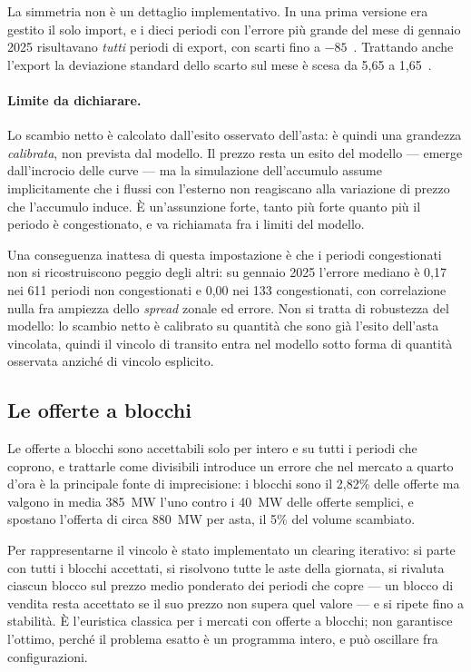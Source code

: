 La simmetria non \`e un dettaglio implementativo. In una prima versione era gestito il solo
import, e i dieci periodi con l'errore pi\`u grande del mese di gennaio 2025 risultavano
\emph{tutti} periodi di export, con scarti fino a $-85$~\euromwh{}. Trattando anche l'export
la deviazione standard dello scarto sul mese \`e scesa da 5{,}65 a 1{,}65~\euromwh{}.

\paragraph{Limite da dichiarare.} Lo scambio netto \`e calcolato dall'esito osservato
dell'asta: \`e quindi una grandezza \emph{calibrata}, non prevista dal modello. Il prezzo
resta un esito del modello — emerge dall'incrocio delle curve — ma la simulazione
dell'accumulo assume implicitamente che i flussi con l'esterno non reagiscano alla variazione
di prezzo che l'accumulo induce. \`E un'assunzione forte, tanto pi\`u forte quanto pi\`u il
periodo \`e congestionato, e va richiamata fra i limiti del modello.

Una conseguenza inattesa di questa impostazione \`e che i periodi congestionati non si
ricostruiscono peggio degli altri: su gennaio 2025 l'errore mediano \`e 0{,}17~\euromwh{} nei
611 periodi non congestionati e 0{,}00 nei 133 congestionati, con correlazione nulla fra
ampiezza dello \emph{spread} zonale ed errore. Non si tratta di robustezza del modello: lo
scambio netto \`e calibrato su quantit\`a che sono gi\`a l'esito dell'asta vincolata, quindi
il vincolo di transito entra nel modello sotto forma di quantit\`a osservata anzich\'e di
vincolo esplicito.

\subsection{Le offerte a blocchi}
\label{sec:blocchi}

Le offerte a blocchi sono accettabili solo per intero e su tutti i periodi che coprono, e
trattarle come divisibili introduce un errore che nel mercato a quarto d'ora \`e la principale
fonte di imprecisione: i blocchi sono il 2{,}82\% delle offerte ma valgono in media 385~MW
l'uno contro i 40~MW delle offerte semplici, e spostano l'offerta di circa 880~MW per asta,
il 5\% del volume scambiato.

Per rappresentarne il vincolo \`e stato implementato un clearing iterativo: si parte con tutti
i blocchi accettati, si risolvono tutte le aste della giornata, si rivaluta ciascun blocco sul
prezzo medio ponderato dei periodi che copre — un blocco di vendita resta accettato se il suo
prezzo non supera quel valore — e si ripete fino a stabilit\`a. \`E l'euristica classica per i
mercati con offerte a blocchi; non garantisce l'ottimo, perch\'e il problema esatto \`e un
programma intero, e pu\`o oscillare fra configurazioni.


